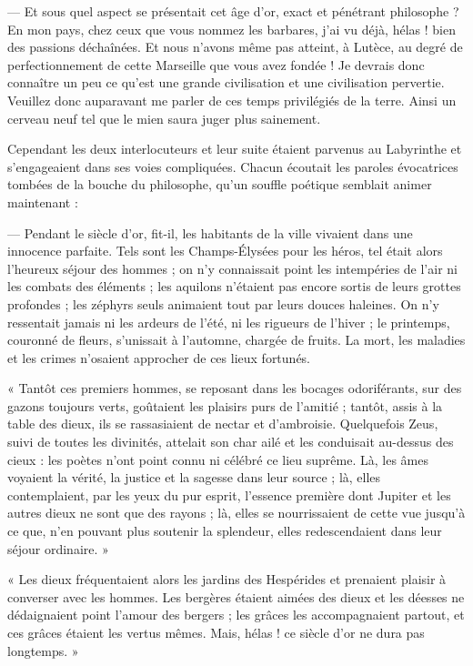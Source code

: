\documentclass[a4paper, 11pt, oneside, polutonikogreek, french]{article}
\begin{document}
\bigskip
\centerline{\EightStarTaper}
\centerline{\EightStarTaper\EightStarTaper}
\bigskip

--- Et sous quel aspect se présentait cet âge d'or, exact et pénétrant philosophe ? En mon pays, chez ceux que vous nommez les barbares, j'ai vu déjà, hélas ! bien des passions déchaînées. Et nous n'avons même pas atteint, à Lutèce, au degré de perfectionnement de cette Marseille que vous avez fondée ! Je devrais donc connaître un peu ce qu'est une grande civilisation et une civilisation pervertie. Veuillez donc auparavant me parler de ces temps privilégiés de la terre. Ainsi un cerveau neuf tel que le mien saura juger plus sainement.

Cependant les deux interlocuteurs et leur suite étaient parvenus au Labyrinthe et s'engageaient dans ses voies compliquées. Chacun écoutait les paroles évocatrices tombées de la bouche du philosophe, qu'un souffle poétique semblait animer maintenant :

--- Pendant le siècle d'or, fit-il, les habitants de la ville vivaient dans une innocence parfaite. Tels sont les Champs-Élysées pour les héros, tel était alors l'heureux séjour des hommes ; on n'y connaissait point les intempéries de l'air ni les combats des éléments ; les aquilons n'étaient pas encore sortis de leurs grottes profondes ; les zéphyrs seuls animaient tout par leurs douces haleines. On n'y ressentait jamais ni les ardeurs de l'été, ni les rigueurs de l'hiver ; le printemps, couronné de fleurs, s'unissait à l'automne, chargée de fruits. La mort, les maladies et les crimes n'osaient approcher de ces lieux fortunés.

« Tantôt ces premiers hommes, se reposant dans les bocages odoriférants, sur des gazons toujours verts, goûtaient les plaisirs purs de l'amitié ; tantôt, assis à la table des dieux, ils se rassasiaient de nectar et d'ambroisie. Quelquefois Zeus, suivi de toutes les divinités, attelait son char ailé et les conduisait au-dessus des cieux : les poètes n'ont point connu ni célébré ce lieu suprême. Là, les âmes voyaient la vérité, la justice et la sagesse dans leur source ; là, elles contemplaient, par les yeux du pur esprit, l'essence première dont Jupiter et les autres dieux ne sont que des rayons ; là, elles se nourrissaient de cette vue jusqu'à ce que, n'en pouvant plus soutenir la splendeur, elles redescendaient dans leur séjour ordinaire. »

« Les dieux fréquentaient alors les jardins des Hespérides et prenaient plaisir à converser avec les hommes. Les bergères étaient aimées des dieux et les déesses ne dédaignaient point l'amour des bergers ; les grâces les accompagnaient partout, et ces grâces étaient les vertus mêmes. Mais, hélas ! ce siècle d'or ne dura pas longtemps. »
\end{document}
